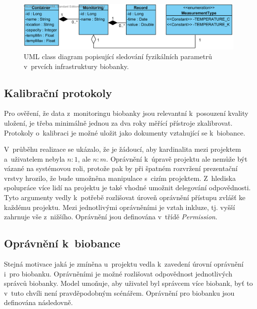 \documentclass[11pt, final, oneside]{fithesis2}
\begin{document}
\begin{figure}[h!]
\begin{center}
	\includegraphics[width=\textwidth]{MonitoringView}
\caption{UML class diagram popisující sledování fyzikálních parametrů v~prvcích infrastruktury biobanky.}
\label{fig:index:uml:class:monitoring}
\end{center}
\end{figure}


\subsection{Kalibrační protokoly}
Pro ověření, že data z~monitoringu biobanky jsou relevantní k~posouzení kvality uložení, je třeba minimálně jednou za dva roky měřící přístroje zkalibrovat. Protokoly o~kalibraci je možné uložit jako dokumenty vztahující se k~biobance.


V~průběhu realizace se ukázalo, že je žádoucí, aby kardinalita mezi projektem a~uživatelem nebyla $n:1$, ale $n:m$. Oprávnění k~úpravě projektu ale nemůže být vázané na systémovou roli, protože pak by při špatném rozvržení prezentační vrstvy hrozilo, že bude umožněna manipulace s~cizím projektem. Z~hlediska spolupráce více lidí na projektu je také vhodné umožnit delegování odpovědnosti. Tyto argumenty vedly k~potřebě rozlišovat úroveň oprávnění přístupu zvlášť ke každému projektu.
Mezi jednotlivými oprávněními je vztah inkluze, tj. vyšší zahrnuje vše z~nižšího. Oprávnění jsou definována v~třídě \textit{Permission}.

  
\subsection{Oprávnění k~biobance}\label{chapter:proposal:subsection:biobankPermission}
Stejná motivace jaká je zmíněna u~projektu vedla k~zavedení úrovní oprávnění i~pro biobanku. Oprávněními je možné rozlišovat odpovědnost jednotlivých správců biobanky. Model umoňuje, aby uživatel byl správcem více biobank, byť to v~tuto chvíli není pravděpodobným scénářem.
Oprávnění pro biobanku jsou definována následovně.
\end{document}
